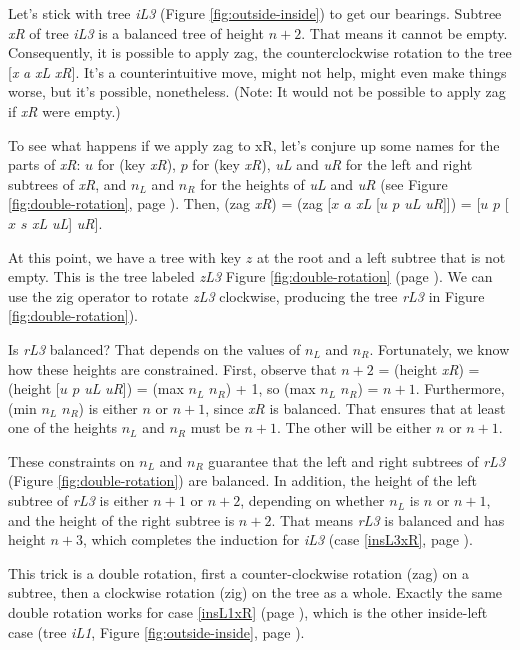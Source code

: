 Let's stick with tree \emph{iL3}
(Figure \ref{fig:outside-inside}) to get our bearings.
Subtree \emph{xR} of tree \emph{iL3} is a balanced tree of height $n+2$.
That means it cannot be empty.
Consequently, it is possible to apply zag, the counterclockwise rotation
to the tree [\emph{x} \emph{a} \emph{xL} \emph{xR}].
It's a counterintuitive move, might not help, might even make things worse,
but it's possible, nonetheless.
\label{no-zag}(Note: It would not be possible to apply zag if \emph{xR} were empty.)

To see what happens if we apply zag to xR,
let's conjure up some names for the parts of \emph{xR}:
$u$ for (key \emph{xR}), $p$ for (key \emph{xR}),
\emph{uL} and \emph{uR} for the left and right subtrees of \emph{xR},
and $n_L$ and $n_R$ for the heights of \emph{uL} and \emph{uR}
(see Figure \ref{fig:double-rotation}, page \pageref{fig:double-rotation}).
Then,
(zag \emph{xR}) =
(zag [$x$ $a$ \emph{xL} [$u$ $p$ \emph{uL} \emph{uR}]]) =
[$u$ $p$ [$x$ $s$ \emph{xL} \emph{uL}] \emph{uR}].

At this point, we have a tree with key $z$ at the root
and a left subtree that is not empty.
This is the tree labeled \emph{zL3} Figure \ref{fig:double-rotation} (page \pageref{fig:double-rotation}).
We can use the zig operator to rotate \emph{zL3} clockwise,
producing the tree \emph{rL3} in Figure \ref{fig:double-rotation}).

Is \emph{rL3} balanced? That depends on the values of $n_L$ and $n_R$.
Fortunately, we know how these heights are constrained.
First, observe that $n+2$ = (height \emph{xR}) =
(height [$u$ $p$ \emph{uL} \emph{uR}]) = (max $n_L$ $n_R$) + 1,
so (max $n_L$ $n_R$) = $n+1$.
Furthermore, (min $n_L$ $n_R$)
is either $n$ or $n+1$, since \emph{xR} is balanced.
That ensures that at least one of the heights $n_L$ and $n_R$ must be $n+1$.
The other will be either $n$ or $n+1$.

These constraints on $n_L$ and $n_R$ guarantee
that the left and right subtrees of \emph{rL3}
(Figure \ref{fig:double-rotation}) are balanced.
In addition, the height of the left subtree of \emph{rL3}
is either $n+1$ or $n+2$,
depending on whether $n_L$ is $n$ or $n+1$,
and the height of the right subtree is $n+2$.
That means \emph{rL3} is balanced and has height $n+3$,
which completes the induction for \emph{iL3}
(case \ref{insL3xR}, page \pageref{out-of-balance-cases}).

This trick is a double rotation, first a counter-clockwise rotation (zag)
on a subtree, then a clockwise rotation (zig) on the tree as a whole.
Exactly the same double rotation works for
case \ref{insL1xR} (page \pageref{out-of-balance-cases}),
which is the other inside-left case
(tree \emph{iL1}, Figure \ref{fig:outside-inside}, page \pageref{fig:outside-inside}).


